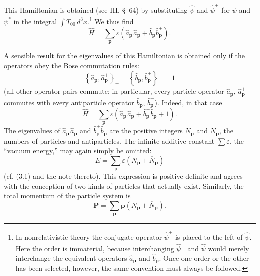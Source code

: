 This Hamiltonian is obtained (see III, \S~64) by substituting $\widehat\psi$ and $\widehat\psi^+$ for $\psi$ and $\psi^*$ in the integral $\int T_{00}\,d^3x$.\footnote{In nonrelativistic theory the conjugate operator $\widehat\psi^+$ is placed to the left of $\widehat\psi$. Here the order is immaterial, because interchanging $\widehat\psi^+$ and $\widehat\psi$ would merely interchange the equivalent operators $\widehat a_{\mathbf p}$ and $\widehat b_{\mathbf p}$. Once one order or the other has been selected, however, the same convention must always be followed.} We thus find
\begin{equation}
\widehat H=\sum_{\mathbf p}\varepsilon
\left(\widehat a^+_{\mathbf p}\widehat a_{\mathbf p}
+\widehat b_{\mathbf p}\widehat b^+_{\mathbf p}\right).
\tag{11.3}
\end{equation}

A sensible result for the eigenvalues of this Hamiltonian is obtained only if the operators obey the Bose commutation rules:
\begin{equation}
\left\{\widehat a_{\mathbf p},\widehat a^+_{\mathbf p}\right\}_{-}
=\left\{\widehat b_{\mathbf p},\widehat b^+_{\mathbf p}\right\}_{-}
=1
\tag{11.4}
\end{equation}
(all other operator pairs commute; in particular, every particle operator $\widehat a_{\mathbf p}$, $\widehat a^+_{\mathbf p}$ commutes with every antiparticle operator $\widehat b_{\mathbf p}$, $\widehat b^+_{\mathbf p}$). Indeed, in that case
\[
\widehat H=\sum_{\mathbf p}\varepsilon
\left(\widehat a^+_{\mathbf p}\widehat a_{\mathbf p}
+\widehat b^+_{\mathbf p}\widehat b_{\mathbf p}+1\right).
\]
The eigenvalues of $\widehat a^+_{\mathbf p}\widehat a_{\mathbf p}$ and $\widehat b^+_{\mathbf p}\widehat b_{\mathbf p}$ are the positive integers $N_{\mathbf p}$ and $\overline N_{\mathbf p}$, the numbers of particles and antiparticles. The infinite additive constant $\sum\varepsilon$, the ``vacuum energy,'' may again simply be omitted:
\begin{equation}
E=\sum_{\mathbf p}\varepsilon
\left(N_{\mathbf p}+\overline N_{\mathbf p}\right)
\tag{11.5}
\end{equation}
(cf. (3.1) and the note thereto). This expression is positive definite and agrees with the conception of two kinds of particles that actually exist. Similarly, the total momentum of the particle system is
\begin{equation}
\mathbf P=\sum_{\mathbf p}\mathbf p
\left(N_{\mathbf p}+\overline N_{\mathbf p}\right).
\tag{11.6}
\end{equation}

